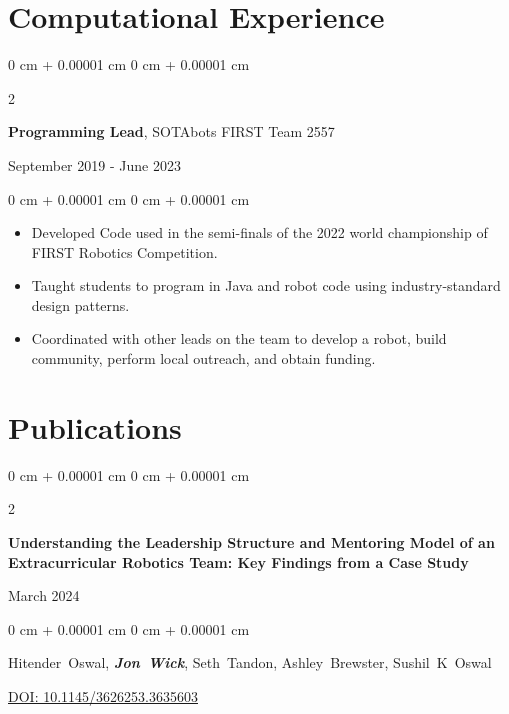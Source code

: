 \documentclass[10pt, letterpaper]{article}
\newenvironment{highlights}{
    \begin{itemize}[
        topsep=0.10 cm,
        parsep=0.10 cm,
        partopsep=0pt,
        itemsep=0pt,
        leftmargin=0 cm + 10pt
    ]
}{
    \end{itemize}
} %
\newenvironment{onecolentry}{
    \begin{adjustwidth}{
        0 cm + 0.00001 cm
    }{
        0 cm + 0.00001 cm
    }
}{
    \end{adjustwidth}
} %
\newenvironment{twocolentry}[2][]{
    \onecolentry
    \def\secondColumn{#2}
    \setcolumnwidth{\fill, 4.5 cm}
    \begin{paracol}{2}
}{
    \switchcolumn \raggedleft \secondColumn
    \end{paracol}
    \endonecolentry
} %
\begin{document}
    \section{Computational Experience}
    \begin{samepage}
      \begin{twocolentry}
        {September 2019 - June 2023}
        \textbf {Programming Lead}, SOTAbots FIRST Team 2557


      \end{twocolentry}
      \begin{onecolentry}
        \begin{highlights}
      \item Developed Code used in the semi-finals of the 2022 world championship of FIRST Robotics Competition.
      \item Taught students to program in Java and robot code using industry-standard design patterns.
      \item Coordinated with other leads on the team to develop a robot, build community, perform local outreach, and obtain funding.

        \end{highlights}
      \end{onecolentry}
    \end{samepage}
    \section{Publications}




        \begin{samepage}
            \begin{twocolentry}{
                March 2024
            }
                \textbf{Understanding the Leadership Structure and Mentoring Model of an Extracurricular Robotics Team: Key Findings from a Case Study}
            \end{twocolentry}

            \vspace{0.10 cm}

            \begin{onecolentry}
              \mbox{Hitender Oswal}, \mbox{\textbf{\textit{Jon Wick}}}, \mbox{Seth Tandon}, \mbox{Ashley Brewster}, \mbox{Sushil K Oswal}

                \vspace{0.10 cm}

        \href{https://doi.org/10.1145/3626253.3635603}{DOI: 10.1145/3626253.3635603}
        \end{onecolentry}
        \end{samepage}
\end{document}
